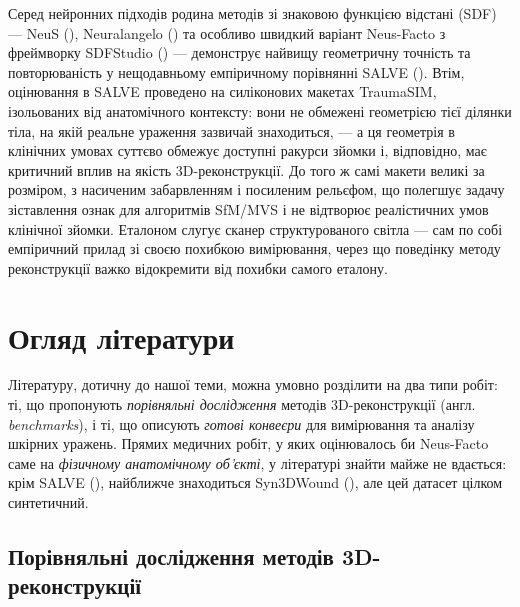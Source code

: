 \documentclass[
  ukrainian,
  10pt,
  a4paper,
  twocolumn]{article}
\begin{document}
Серед нейронних підходів родина методів зі знаковою функцією відстані
(SDF) --- NeuS (),
Neuralangelo () та
особливо швидкий варіант Neus-Facto з фреймворку SDFStudio
() --- демонструє найвищу
геометричну точність та повторюваність у нещодавньому емпіричному
порівнянні SALVE (). Втім, оцінювання в SALVE проведено на силіконових макетах
TraumaSIM, ізольованих від анатомічного контексту: вони не обмежені
геометрією тієї ділянки тіла, на якій реальне ураження зазвичай
знаходиться, --- а ця геометрія в клінічних умовах суттєво обмежує
доступні ракурси зйомки і, відповідно, має критичний вплив на якість
3D-реконструкції. До того ж самі макети великі за розміром, з насиченим
забарвленням і посиленим рельєфом, що полегшує задачу зіставлення ознак
для алгоритмів SfM/MVS і не відтворює реалістичних умов клінічної
зйомки. Еталоном слугує сканер структурованого світла --- сам по собі
емпіричний прилад зі своєю похибкою вимірювання, через що поведінку
методу реконструкції важко відокремити від похибки самого еталону.

\section{Огляд
літератури}\label{ux43eux433ux43bux44fux434-ux43bux456ux442ux435ux440ux430ux442ux443ux440ux438}

Літературу, дотичну до нашої теми, можна умовно розділити на два типи
робіт: ті, що пропонують \emph{порівняльні дослідження} методів
3D-реконструкції (англ. \emph{benchmarks}), і ті, що описують
\emph{готові конвеєри} для вимірювання та аналізу шкірних уражень.
Прямих медичних робіт, у яких оцінювалось би Neus-Facto саме на
\emph{фізичному анатомічному об'єкті}, у літературі знайти майже не
вдається: крім SALVE (), найближче знаходиться Syn3DWound
(), але цей
датасет цілком синтетичний.

\subsection{Порівняльні дослідження методів
3D-реконструкції}\label{ux43fux43eux440ux456ux432ux43dux44fux43bux44cux43dux456-ux434ux43eux441ux43bux456ux434ux436ux435ux43dux43dux44f-ux43cux435ux442ux43eux434ux456ux432-3d-ux440ux435ux43aux43eux43dux441ux442ux440ux443ux43aux446ux456ux457}
\end{document}
